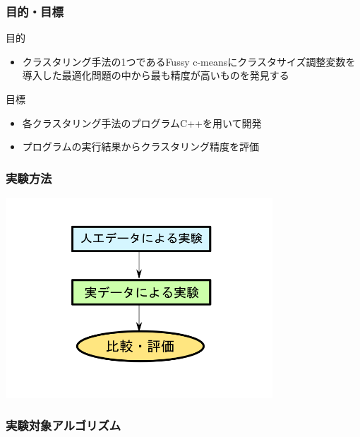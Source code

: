 \documentclass[13pt,dvipdfmx]{beamer}
\begin{document}
\begin{frame}\frametitle{目的・目標}
\begin{block}{目的}
\begin{itemize}
 \item クラスタリング手法の1つであるFussy c-meansにクラスタサイズ調整変数を導入した最適化問題の中から最も精度が高いものを発見する
\end{itemize}
\end{block}
\vspace{4mm}
\begin{block}{目標}
\begin{itemize}
 \item 各クラスタリング手法のプログラムC++を用いて開発
 \item プログラムの実行結果からクラスタリング精度を評価
\end{itemize}
\end{block}
\end{frame}

\begin{frame}\frametitle{実験方法}
\begin{center}
 \includegraphics[width=100mm]{experiment_process.png}
\end{center}
\end{frame}

\begin{frame}\frametitle{実験対象アルゴリズム}
  \begin{center}
    
  \end{center}
\end{frame}
\end{document}
